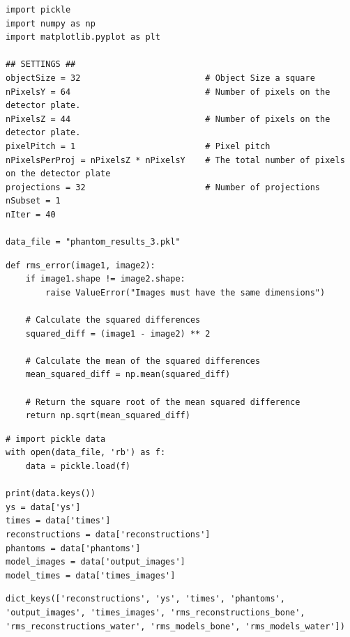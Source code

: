 \begin{verbatim}
import pickle
import numpy as np
import matplotlib.pyplot as plt

## SETTINGS ##
objectSize = 32                         # Object Size a square
nPixelsY = 64                           # Number of pixels on the detector plate.
nPixelsZ = 44                           # Number of pixels on the detector plate.
pixelPitch = 1                          # Pixel pitch
nPixelsPerProj = nPixelsZ * nPixelsY    # The total number of pixels on the detector plate
projections = 32                        # Number of projections
nSubset = 1
nIter = 40  

data_file = "phantom_results_3.pkl"
\end{verbatim}

\begin{verbatim}
def rms_error(image1, image2):
    if image1.shape != image2.shape:
        raise ValueError("Images must have the same dimensions")

    # Calculate the squared differences
    squared_diff = (image1 - image2) ** 2

    # Calculate the mean of the squared differences
    mean_squared_diff = np.mean(squared_diff)

    # Return the square root of the mean squared difference
    return np.sqrt(mean_squared_diff)
\end{verbatim}

\begin{verbatim}
# import pickle data
with open(data_file, 'rb') as f:
    data = pickle.load(f)

print(data.keys())
ys = data['ys']
times = data['times']
reconstructions = data['reconstructions']
phantoms = data['phantoms']
model_images = data['output_images']
model_times = data['times_images']
\end{verbatim}

\begin{verbatim}
dict_keys(['reconstructions', 'ys', 'times', 'phantoms', 'output_images', 'times_images', 'rms_reconstructions_bone', 'rms_reconstructions_water', 'rms_models_bone', 'rms_models_water'])
\end{verbatim}

